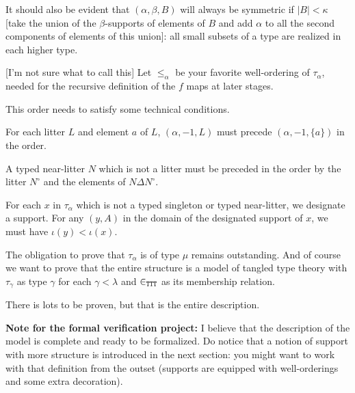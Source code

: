 \begin{lemma}
\label {lem:small-subsets-closure}

It should also be evident that $(\alpha,\beta,B)$ will always be symmetric if $|B|<\kappa$ [take the union of the $\beta$-supports of elements of $B$ and add $\alpha$ to all the second components of elements of this union]:  all small subsets of a type are realized in each higher type.

\begin{definition}
\label {def:word-obligation}

[I'm not sure what to call this]  Let $\leq_\alpha$ be your favorite well-ordering of $\tau_\alpha$, needed for the recursive definition of the $f$ maps at later stages.

This order needs to satisfy some technical conditions.

For each litter $L$ and element $a$ of $L$, $(\alpha,-1,L)$ must precede $(\alpha,-1,\{a\})$ in the order.

A typed near-litter $N$ which is not a litter must be preceded in the order by the litter $N^\circ$ and the elements of
$N \Delta N^\circ$.

For each $x$ in $\tau_\alpha$ which is not a typed singleton or typed near-litter, we designate a support.  For any $(y,A)$ in the domain of the designated support of $x$, we must have $\iota(y)<\iota(x)$.

\end{definition}

\end{lemma}


The obligation to prove that $\tau_\alpha$ is of type $\mu$ remains outstanding.  And of course we want to prove that the entire structure is a model of tangled type theory with $\tau_\gamma$ as type $\gamma$ for each $\gamma<\lambda$ and $\in_{\tt TTT}$ as its membership relation.

There is lots to be proven, but that is the entire description.


{\bf Note for the formal verification project:}  I believe that the description of the model is complete and ready to be formalized.  Do notice that a notion of support with more structure is introduced in the next section:  you might want to work with that definition from the outset (supports are equipped with well-orderings and some extra decoration).


